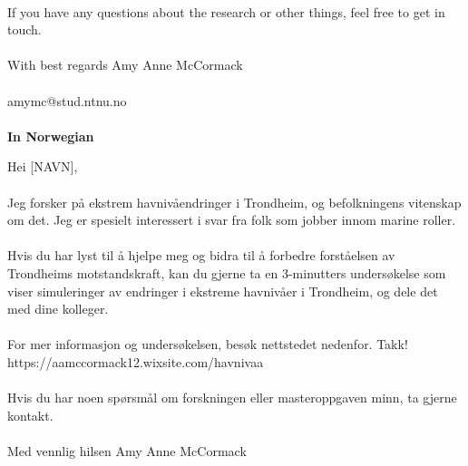 \paragraph{}
If you have any questions about the research or other things, feel free to get in touch.
\paragraph{}
With best regards
\newline
Amy Anne McCormack
\paragraph{}
amymc@stud.ntnu.no
\paragraph{}

\textbf{In Norwegian}

Hei [NAVN],
\paragraph{}
Jeg forsker på ekstrem havnivåendringer i Trondheim, og befolkningens vitenskap om det.  Jeg er spesielt interessert i svar fra folk som jobber innom marine roller.
\paragraph{}
Hvis du har lyst til å hjelpe meg og bidra til å forbedre forståelsen av Trondheims motstandskraft, kan du gjerne ta en 3-minutters undersøkelse som viser simuleringer av endringer i ekstreme havnivåer i Trondheim, og dele det med dine kolleger.
\paragraph{}
For mer informasjon og undersøkelsen, besøk nettstedet nedenfor. Takk! https://aamccormack12.wixsite.com/havnivaa
\paragraph{}
Hvis du har noen spørsmål om forskningen eller masteroppgaven minn, ta gjerne kontakt.
\paragraph{}
 

Med vennlig hilsen 
\newline
Amy Anne McCormack
